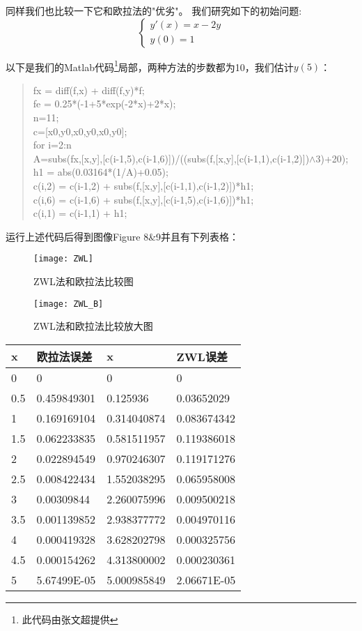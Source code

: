 \documentclass[a4paper,12pt]{article}
\begin{document}
同样我们也比较一下它和欧拉法的"优劣"。
我们研究如下的初始问题:
\begin{equation}
    \left\{
      \begin{array}{ll}
        y'(x)=x-2 y\\
        y(0)=1
      \end{array}
    \right.
\end{equation}

以下是我们的Matlab代码\footnote{此代码由张文超提供}局部，两种方法的步数都为10，我们估计$y(5)$：
\begin{quote}
\small{
fx = diff(f,x) + diff(f,y)*f;\\
fe = 0.25*(-1+5*exp(-2*x)+2*x);\\
n=11;\\
c=[x0,y0,x0,y0,x0,y0];\\
for i=2:n\\
    A=subs(fx,[x,y],[c(i-1,5),c(i-1,6)])/((subs(f,[x,y],[c(i-1,1),c(i-1,2)])$\wedge$3)+20);\\
    h1 = abs(0.03164*(1/A)+0.05);\\
    c(i,2) = c(i-1,2) + subs(f,[x,y],[c(i-1,1),c(i-1,2)])*h1;\\
    c(i,6) = c(i-1,6) + subs(f,[x,y],[c(i-1,5),c(i-1,6)])*h1;\\
    c(i,1) = c(i-1,1) + h1;\\
}
\end{quote}

运行上述代码后得到图像Figure 8\&9并且有下列表格：
\begin{figure*}
\begin{minipage}[t]{0.5\textwidth}
\centering
\texttt{[image: ZWL]}
\caption{ZWL法和欧拉法比较图}
\end{minipage}%
\begin{minipage}[t]{0.5\textwidth}
\centering
\texttt{[image: ZWL\_B]}
\caption{ZWL法和欧拉法比较放大图}
\end{minipage}%
\end{figure*}

\begin{center}
\begin{tabular}{|l|l|l|l|}
  \hline
x&欧拉法误差&x&ZWL误差\\
\hline
0&0&0&0\\
0.5&0.459849301&0.125936&0.03652029\\
1&0.169169104&0.314040874&0.083674342\\
1.5&0.062233835&0.581511957&0.119386018\\
2&0.022894549&0.970246307&0.119171276\\
2.5&0.008422434&1.552038295&0.065958008\\
3&0.00309844&2.260075996&0.009500218\\
3.5&0.001139852&2.938377772&0.004970116\\
4&0.000419328&3.628202798&0.000325756\\
4.5&0.000154262&4.313800002&0.000230361\\
5&5.67499E-05&5.000985849&2.06671E-05\\
  \hline
\end{tabular}
\end{center}
\end{document}

